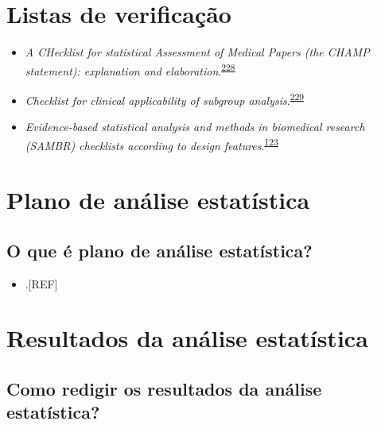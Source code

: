 \documentclass[
  a4paper,
]{book}
\providecommand{\tightlist}{%
  \setlength{\itemsep}{0pt}\setlength{\parskip}{0pt}}
\begin{document}
\hypertarget{checklists}{%
\section{Listas de verificação}\label{checklists}}

\begin{itemize}
\item
  \emph{A CHecklist for statistical Assessment of Medical Papers (the CHAMP statement): explanation and elaboration}.\textsuperscript{\protect\hyperlink{ref-Mansournia2021}{228}}
\item
  \emph{Checklist for clinical applicability of subgroup analysis}.\textsuperscript{\protect\hyperlink{ref-Gil-Sierra2020}{229}}
\item
  \emph{Evidence-based statistical analysis and methods in biomedical research (SAMBR) checklists according to design features}.\textsuperscript{\protect\hyperlink{ref-dwivedi2019}{123}}
\end{itemize}

\hypertarget{plano-analise-estatistica}{%
\section{Plano de análise estatística}\label{plano-analise-estatistica}}

\hypertarget{o-que-uxe9-plano-de-anuxe1lise-estatuxedstica}{%
\subsection{O que é plano de análise estatística?}\label{o-que-uxe9-plano-de-anuxe1lise-estatuxedstica}}

\begin{itemize}
\tightlist
\item
  .{[}REF{]}
\end{itemize}

\hypertarget{resultados-analise-estatistica}{%
\section{Resultados da análise estatística}\label{resultados-analise-estatistica}}

\hypertarget{como-redigir-os-resultados-da-anuxe1lise-estatuxedstica}{%
\subsection{Como redigir os resultados da análise estatística?}\label{como-redigir-os-resultados-da-anuxe1lise-estatuxedstica}}
\end{document}
